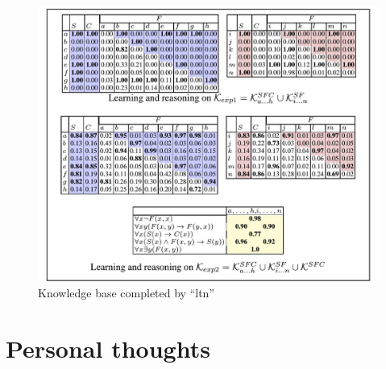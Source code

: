 \documentclass{article}
\begin{document}
\begin{figure}[H]
	\includegraphics[scale=0.2]{table}
	\caption{Knowledge base completed by ``ltn'' \cite{LTN}}
\end{figure}

\section{Personal thoughts}
\end{document}
